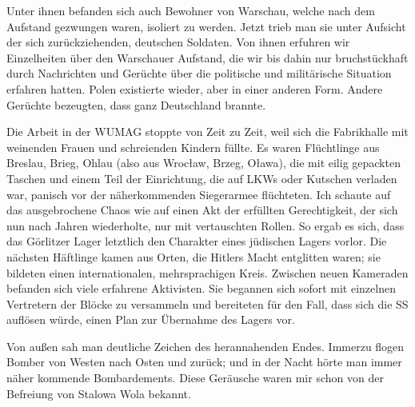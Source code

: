 \documentclass[a4paper,12pt,ngerman,
]{nisebook}
\begin{document}
Unter ihnen befanden sich auch Bewohner von Warschau, welche nach dem Aufstand gezwungen waren, isoliert zu werden. Jetzt trieb man sie unter Aufsicht der sich zurückziehenden, deutschen Soldaten. Von ihnen erfuhren wir Einzelheiten über den Warschauer Aufstand, die wir bis dahin nur bruchstückhaft durch Nachrichten und Gerüchte über die politische und militärische Situation erfahren hatten. Polen existierte wieder, aber in einer anderen Form. Andere Gerüchte bezeugten, dass ganz Deutschland brannte. 

Die Arbeit in der WUMAG stoppte von Zeit zu Zeit, weil sich die Fabrikhalle mit weinenden Frauen und schreienden Kindern füllte. Es waren Flüchtlinge aus Breslau, Brieg, Ohlau (also aus Wroc\l aw, Brzeg, O\l awa), die mit eilig gepackten Taschen und einem Teil der Einrichtung, die auf LKWs oder Kutschen verladen war, panisch vor der näherkommenden Siegerarmee flüchteten. Ich schaute auf das ausgebrochene Chaos wie auf einen Akt der erfüllten Gerechtigkeit, der sich nun nach Jahren wiederholte, nur mit vertauschten Rollen. So ergab es sich, dass das Görlitzer Lager letztlich den Charakter eines jüdischen Lagers vorlor. Die nächsten Häftlinge kamen aus Orten, die Hitlers Macht entglitten waren; sie bildeten einen internationalen, mehrsprachigen Kreis. Zwischen neuen Kameraden befanden sich viele erfahrene Aktivisten. Sie begannen sich sofort mit einzelnen Vertretern der Blöcke zu versammeln und bereiteten für den Fall, dass sich die SS auflösen würde, einen Plan zur Übernahme des Lagers vor.

Von außen sah man deutliche Zeichen des herannahenden Endes. Immerzu flogen Bomber von Westen nach Osten und zurück; und in der Nacht hörte man immer näher kommende Bombardements. Diese Geräusche waren mir schon von der Befreiung von Stalowa Wola bekannt.
\end{document}
